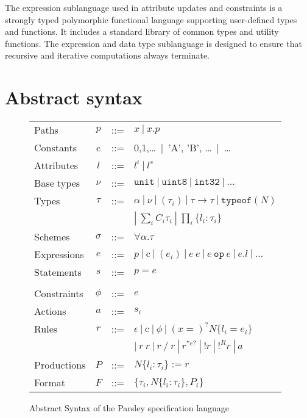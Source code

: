 \documentclass[letterpaper]{article}
\begin{document}
The expression sublanguage used in attribute updates and constraints
is a strongly typed polymorphic functional language supporting
user-defined types and functions.  It includes a standard library of
common types and utility functions.  The expression and data type
sublanguage is  designed to ensure that recursive and
iterative computations always terminate.

\section{Abstract syntax}

\begin{figure}
  \begin{tabular}{l c l l}
    Paths        & $p$      & ::= & $x\ |\ x.p$ \\
    Constants    & c        & ::= & 0,1,\ldots\ $|$\ 'A', 'B', \ldots\ $|$\ \ldots \\
    Attributes   & $l$      & ::= & $l^i\ |\ l^s$ \\
    Base types   & $\nu$    & ::= & $ \texttt{unit}\ |\ \texttt{uint8}\ |\ \texttt{int32}\ |\ \ldots\ $ \\
    Types        & $\tau$   & ::= & $\alpha\ |\ \nu\ |\ (\tau_i)\ |\ \tau\rightarrow\tau\ |\ \texttt{typeof}(N)$ \\
                 &          &     & $|\ \sum_i C_i\tau_i\ |\ \prod_i \{l_i:\tau_i\}\ $ \\
    Schemes      & $\sigma$ & ::= & $\forall\alpha.\tau$ \\
    Expressions  & $e$      & ::= & $p\ |\ \textrm{c}\ |\ (e_i)\ |\ e\ e\ |\ e\ \texttt{op}\ e\ |\ e.l\ |\ \ldots\ $ \\
    Statements   & $s$      & ::= & $ p = e $ \\
                 &          &     & \\
    Constraints  & $\phi$   & ::= & $ e $ \\
    Actions      & $a$      & ::= & $ {s_i} $ \\
    Rules        & $r$      & ::= & $ \epsilon\ |\ \textrm{c}\ |\ \phi\ |\ (x=)^?N\{l_i=e_i\}$ \\
                 &          &     & $|\ r\ r\ |\ r\ /\ r\ |\ r^{*e?}\ |\ !r\ |\ !^Rr\ |\ a$ \\
    Productions  & $P$      & ::= & $ N\{l_i:\tau_i\} := r$ \\
    Format       & $F$      & ::= & $ \{ \tau_i, N\{l_i:\tau_i\}, P_i \}$ \\
  \end{tabular}
  \caption{Abstract Syntax of the Parsley specification language}
  \label{f:parsley-syntax}
\end{figure}
\end{document}
